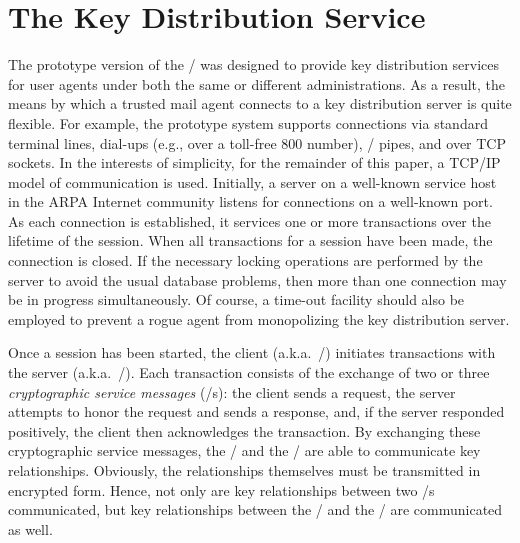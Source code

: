 \section{The Key Distribution Service}
The prototype version of the \KDS/
was designed to provide key distribution services for
user agents under both the same or different administrations.
As a result,
the means by which a trusted mail agent connects to a key distribution server
is quite flexible.
For example,
the prototype system supports connections via
standard terminal lines,
dial-ups (e.g., over a toll-free 800 number),
\unix/ pipes,
and over TCP sockets\cite{IP,TCP}.
In the interests of simplicity,
for the remainder of this paper,
a TCP/IP model of communication is used.
Initially,
a server on a well-known service host in the ARPA Internet community
listens for connections on a well-known port.%
As each connection is established,
it services one or more transactions over the lifetime of the session.
When all transactions for a session have been made,
the connection is closed.
If the necessary locking operations are performed by the server
to avoid the usual database problems,
then more than one connection may be in progress simultaneously.
Of course,
a time-out facility should also be employed to prevent a rogue agent from
monopolizing the key distribution server.

Once a session has been started,
the client (a.k.a.~\TMA/) initiates transactions with the server
(a.k.a.~\KDS/).
Each transaction consists of the exchange of two or three
{\it cryptographic service messages} (\CSM/s):
the client sends a request,
the server attempts to honor the request and sends a response,
and,
if the server responded positively,
the client then acknowledges the transaction.
By exchanging these cryptographic service messages,
the \KDS/ and the \TMA/ are able to communicate key relationships.
Obviously, the relationships themselves must be transmitted in encrypted
form.%
Hence, not only are key relationships between two \TMA/s communicated,
but key relationships between the \KDS/ and the \TMA/ are communicated as well.

